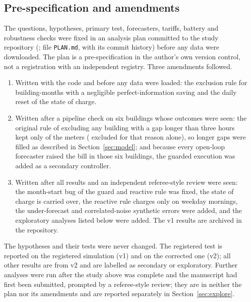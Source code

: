 \subsection{Pre-specification and amendments}
The questions, hypotheses, primary test, forecasters, tariffs, battery and robustness checks were fixed in an analysis plan committed to the study repository (\repolink; file \texttt{PLAN.md}, with its commit history) before any data were downloaded. The plan is a pre-specification in the author's own version control, not a registration with an independent registry. Three amendments followed.
\begin{enumerate}
\item Written with the code and before any data were loaded: the exclusion rule for building-months with a negligible perfect-information saving and the daily reset of the state of charge.
\item Written after a pipeline check on six buildings whose outcomes were seen: the original rule of excluding any building with a gap longer than three hours kept only  of the  meters ( excluded for that reason alone), so longer gaps were filled as described in Section~\ref{sec:model}; and because every open-loop forecaster raised the bill in those six buildings, the guarded execution was added as a secondary controller.
\item Written after all results and an independent referee-style review were seen: the month-start bug of the guard and reactive rule was fixed, the state of charge is carried over, the reactive rule charges only on weekday mornings, the under-forecast and correlated-noise synthetic errors were added, and the exploratory analyses listed below were added. The v1 results are archived in the repository.
\end{enumerate}
The hypotheses and their tests were never changed. The registered test is reported on the registered simulation (v1) and on the corrected one (v2); all other results are from v2 and are labelled as secondary or exploratory. Further analyses were run after the study above was complete and the manuscript had first been submitted, prompted by a referee-style review; they are in neither the plan nor its amendments and are reported separately in Section~\ref{sec:explore}.

